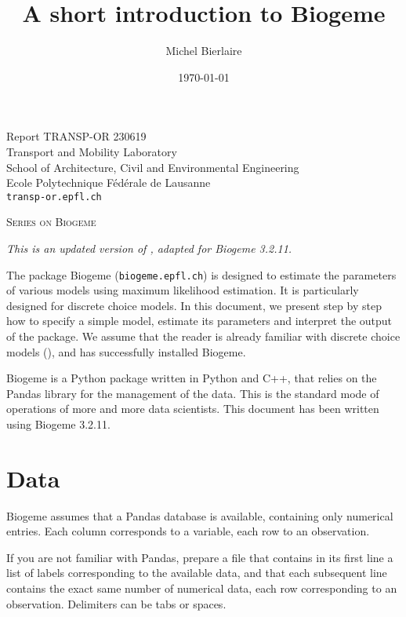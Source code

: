 \documentclass[12pt,a4paper]{article}
\title{A short introduction to Biogeme}
\author{Michel Bierlaire}
\date{\today}
\begin{document}
\begin{titlepage}
\pagestyle{empty}

\maketitle
\vspace{2cm}

\begin{center}
\small Report TRANSP-OR 230619 \\ Transport and Mobility Laboratory \\ School of Architecture, Civil and Environmental Engineering \\ Ecole Polytechnique F\'ed\'erale de Lausanne \\ \verb+transp-or.epfl.ch+
\begin{center}
\textsc{Series on Biogeme}
\end{center}

\emph{This is an updated version of , adapted for
  Biogeme 3.2.11.}
\end{center}


\clearpage
\end{titlepage}


The package Biogeme (\texttt{biogeme.epfl.ch}) is designed to estimate the parameters of
various models using maximum likelihood estimation. It is particularly
designed for discrete choice models. In this document, we present step
by step how to specify a simple model, estimate its parameters and
interpret the output of the  package.  We assume that the
reader is already familiar with discrete choice models (\cite{BenALerm85}), and has
successfully installed Biogeme. 



Biogeme is a  Python
package written in Python and C++, that relies on the Pandas library
for the management of the data. This is the standard mode of operations of more and more
data scientists.   This document has been written using
Biogeme 3.2.11.

\section{Data}

Biogeme assumes that a Pandas database is available, containing only numerical
entries. Each column corresponds to a variable, each row to an
observation.

If you are not familiar with Pandas, prepare a file that contains in its first line a list
of labels corresponding to the available data, and that each
subsequent line contains the exact same number of numerical data, each
row corresponding to an observation. Delimiters can be tabs or
spaces. 
\end{document}
